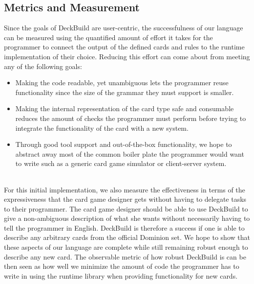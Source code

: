 \subsection{Metrics and Measurement}
Since the goals of DeckBuild are user-centric, the successfulness of our language can be measured using the quantified
amount of effort it takes for the programmer to connect the output of the defined cards and rules to the runtime implementation of their
choice. Reducing this effort can come about from meeting any of the following goals:
\begin{itemize}
\item Making the code readable, yet unambiguous
lets the programmer reuse functionality since the size of the grammar they must support is smaller.
\item Making the internal representation of
the card type safe and consumable reduces the amount of checks the programmer must perform before trying to integrate the functionality of
the card with a new system.
\item Through good tool support and out-of-the-box functionality, we hope to abstract away most of the common
boiler plate the programmer would want to write such as a generic card game simulator or client-server system.
\end{itemize}
\\
For this initial implementation, we also measure the effectiveness in terms of the expressiveness that the card game designer gets
without having to delegate tasks to their programmer. The card game designer should be able to use DeckBuild to give a non-ambiguous
description of what she wants without necessarily having to tell the programmer in English.
DeckBuild is therefore a success if one is able to describe any arbitrary cards from the
official Dominion set. We hope to show that these aspects of our language are complete while still remaining robust enough to describe any
new card. The observable metric of how robust DeckBuild is can be then seen as how well we minimize the amount of code the programmer has to
write in using the runtime library when providing functionality for new cards.

